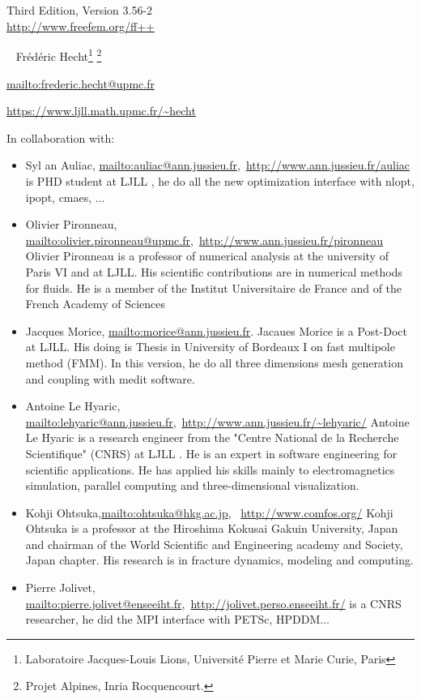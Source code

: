 \documentclass[a4paper,twoside,12pt]{book}
\def\VERSION{3.56-2}
\begin{document}
\begin{center}
 {} \\ \vglue 0.0cm  ~ \\
   Third Edition, Version \VERSION
 \\ \vglue 0.7cm
 {\Large \url{http://www.freefem.org/ff++}} \\
\vglue 0.5cm

 \
{ Fr\'{e}d\'{e}ric Hecht\footnote{Laboratoire Jacques-Louis Lions, Universit\'{e} Pierre et Marie Curie, Paris}
\footnote{Projet Alpines, Inria Rocquencourt.} }

\url{mailto:frederic.hecht@upmc.fr}

\url{https://www.ljll.math.upmc.fr/~hecht}


\bigskip

In collaboration with:
{\small
\begin{itemize}
\item {\normalsize Syl	an Auliac}, \url{mailto:auliac@ann.jussieu.fr},~\url{http://www.ann.jussieu.fr/auliac}
{is PHD student at LJLL  , he do all the new optimization interface with nlopt, ipopt, cmaes, ...}

\item {\normalsize Olivier Pironneau}, \url{mailto:olivier.pironneau@upmc.fr},~\url{http://www.ann.jussieu.fr/pironneau}
{Olivier Pironneau is a professor of numerical analysis at the university of Paris VI and at LJLL.  His scientific contributions are in numerical methods for fluids.  He is a member of the Institut Universitaire de France and of the French  Academy of Sciences}
\item {\normalsize Jacques Morice}, \url{mailto:morice@ann.jussieu.fr}.
Jacaues Morice is a Post-Doct at LJLL. His doing is Thesis in University of Bordeaux I on fast multipole method (FMM).
In this version, he do all three dimensions mesh generation and coupling with medit software.
\item {\normalsize Antoine Le Hyaric}, \url{mailto:lehyaric@ann.jussieu.fr},~\url{http://www.ann.jussieu.fr/~lehyaric/}
{Antoine Le Hyaric}{ is a research engineer  from the "Centre National de la
Recherche Scientifique" (CNRS) at LJLL . He is an expert in software engineering
for scientific applications. He has applied his skills mainly to
electromagnetics simulation, parallel computing and three-dimensional
visualization.}
\item {\normalsize Kohji Ohtsuka},\url{mailto:ohtsuka@hkg.ac.jp},~ \url{http://www.comfos.org/}
{Kohji Ohtsuka}{ is a professor at the Hiroshima Kokusai Gakuin University, Japan and chairman of the World Scientific and Engineering academy and Society, Japan chapter.  His research is in fracture dynamics, modeling and computing.}
\item {\normalsize Pierre  Jolivet}, \url{mailto:pierre.jolivet@enseeiht.fr},~\url{http://jolivet.perso.enseeiht.fr/}
{is a CNRS researcher, he did the MPI interface with PETSc, HPDDM...}

\end{itemize}}
\end{center}
\end{document}
